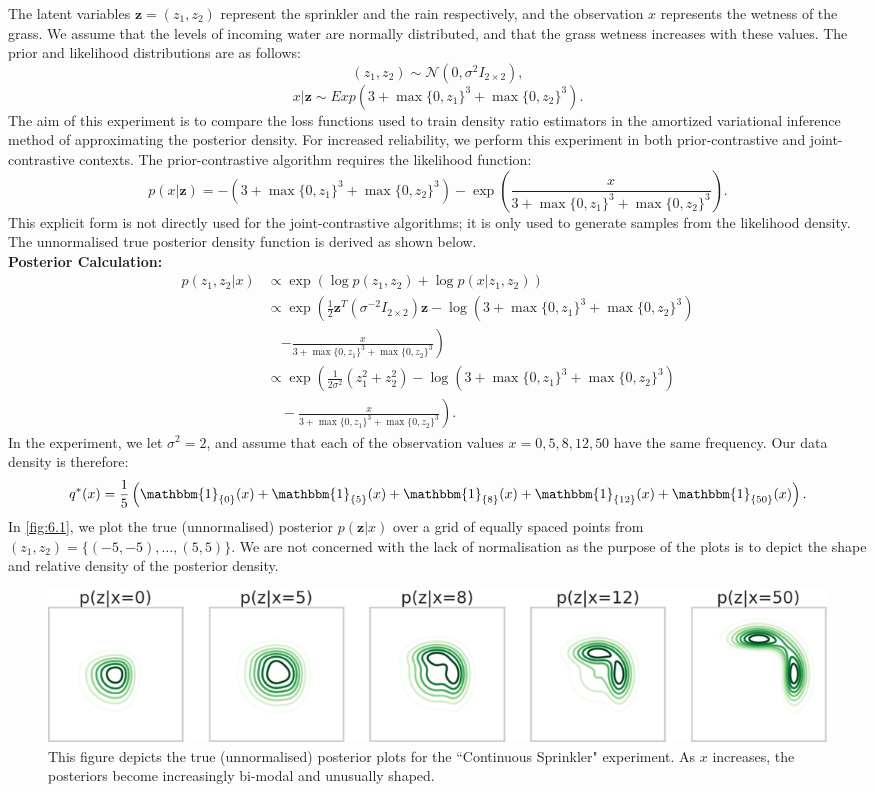 \documentclass[honours,12pt, twoside]{unswthesis}
\numberwithin{equation}{section}
\theoremstyle{definition}
\begin{document}
The latent variables $\bm{z}=(z_1, z_2)$ represent the sprinkler and the rain respectively, and the observation $x$ represents the wetness of the grass. We assume that the levels of incoming water are normally distributed, and that the grass wetness increases with these values. The prior and likelihood distributions are as follows:
\[(z_1,z_2)\sim \mathcal{N} (0,\sigma^2 I_{2\times 2}),\]
\[x|\bm{z}\sim Exp(3+\max\{0,z_1\}^3+\max\{0,z_2\}^3).\]
The aim of this experiment is to compare the loss functions used to train density ratio estimators in the amortized variational inference method of approximating the posterior density. For increased reliability, we perform this experiment in both prior-contrastive and joint-contrastive contexts. The prior-contrastive algorithm requires the likelihood function:
\[p(x|\bm{z})=-(3+\max \{0,z_1\}^3+\max\{0,z_2\}^3)-\exp\left(\frac{x}{3+\max \{0,z_1\}^3+\max\{0,z_2\}^3}\right).\]
This explicit form is not directly used for the joint-contrastive algorithms; it is only used to generate samples from the likelihood density.\\
The unnormalised true posterior density function is derived as shown below.\\
\textbf{Posterior Calculation:}
\begin{equation}
\begin{aligned}
p(z_1,z_2|x)&\propto \exp(\log p(z_1,z_2)+\log p(x|z_1,z_2))\\
&\propto\exp\left(\frac12\bm{z}^T(\sigma^{-2}I_{2\times 2})\bm{z}-\log (3+\max\{0,z_1\}^3+\max\{0,z_2\}^3)\right.\\
&\quad\left.-\frac{x}{3+\max\{0,z_1\}^3+\max\{0,z_2\}^3}\right)\\
&\propto \exp\left(\frac{1}{2\sigma^2}(z_1^2+z_2^2)-\log (3+\max\{0,z_1\}^3+\max\{0,z_2\}^3)\right.\\
&\left.\quad-\frac{x}{3+\max\{0,z_1\}^3+\max\{0,z_2\}^3}\right).
\end{aligned}
\end{equation}
In the experiment, we let $\sigma^2=2$, and assume that each of the observation values $x=0,5,8,12,50$ have the same frequency. Our data density is therefore:
\[q^*(x)= \frac{1}{5}\left(\mathbbm{1}_{\{0\}}(x)+\mathbbm{1}_{\{5\}}(x)+\mathbbm{1}_{\{8\}}(x)+\mathbbm{1}_{\{12\}}(x)+\mathbbm{1}_{\{50\}}(x)\right).\] In \autoref{fig:6.1}, we plot the true (unnormalised) posterior $p(\bm{z}|x)$ over a grid of equally spaced points from $(z_1,z_2)=\{(-5,-5),\dots, (5,5)\}$. We are not concerned with the lack of normalisation as the purpose of the plots is to depict the shape and relative density of the posterior density.
\begin{figure}[h]
\includegraphics[width=\textwidth]{sprinklertrue.png}
\caption{\small This figure depicts the true (unnormalised) posterior plots for the ``Continuous Sprinkler" experiment. As $x$ increases, the posteriors become increasingly bi-modal and unusually shaped.}
\label{fig:6.1}
\end{figure}
\end{document}
